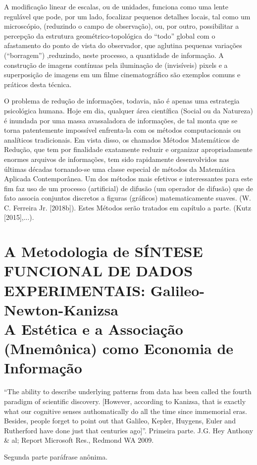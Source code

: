     A modificação linear de escalas, ou de unidades, funciona como uma lente regulável que pode, por um lado, focalizar pequenos detalhes locais, tal como um microscópio, (reduzindo o campo de observação), ou, por outro, possibilitar a percepção da estrutura geométrico-topológica do ``todo'' global com o afastamento do ponto de vista do observador, que aglutina pequenas variações (``borragem'') ,reduzindo, neste processo, a quantidade de informação. A construção de imagens contínuas pela iluminação de (invisíveis) pixels e a superposição de imagens em um filme cinematográfico são exemplos comuns e práticos desta técnica. 

    O problema de redução de informações, todavia, não é apenas uma estrategia psicológica humana. Hoje em dia, qualquer área científica (Social ou da Natureza) é inundada por uma massa avassaladora de informações, de tal monta que se torna patentemente impossível enfrenta-la com os métodos computacionais ou analíticos tradicionais. Em vista disso, os chamados Métodos Matemáticos de Redução, que tem por finalidade exatamente reduzir e organizar apropriadamente enormes arquivos de informações, tem sido rapidamente desenvolvidos nas últimas décadas tornando-se uma classe especial de métodos da Matemática Aplicada Contemporânea. Um dos métodos mais efetivos e   interessantes para este fim faz uso de um processo (artificial) de difusão (um operador de difusão) que de fato associa conjuntos discretos a figuras (gráficos) matematicamente suaves. (W. C. Ferreira Jr. [2018b]). Estes Métodos serão tratados em capítulo a parte. (Kutz [2015],...).


\section{A Metodologia de SÍNTESE FUNCIONAL DE DADOS EXPERIMENTAIS: Galileo-Newton-Kanizsa \\ A Estética e a Associação (Mnemônica) como Economia de Informação}

\begin{citacao}
    ``The ability to describe underlying patterns from data has been called the fourth paradigm of scientific discovery. [However, according to Kanizsa, that is exactly what our cognitive senses authomatically do all the time since immemorial eras. Besides, people forget to point out that Galileo, Kepler, Huygens, Euler and Rutherford have done just that centuries ago]''. Primeira parte. J.G. Hey Anthony \& al; Report Microsoft Res., Redmond WA 2009.
    
    Segunda parte paráfrase anônima.
\end{citacao}





